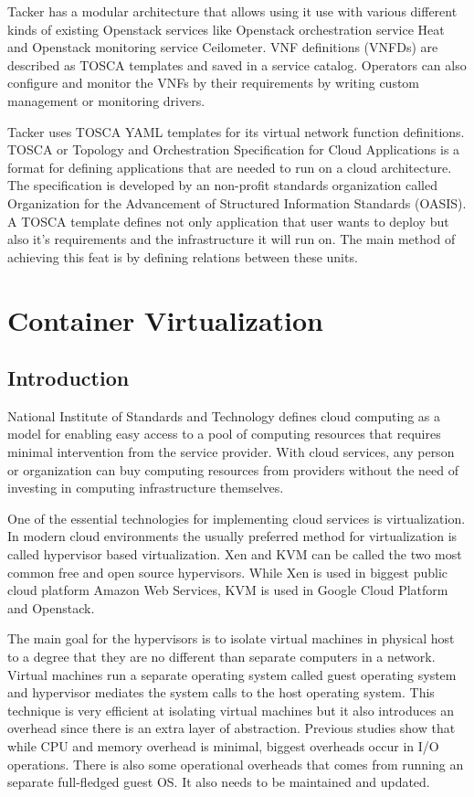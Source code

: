 \documentclass[12pt,oneandhalf,chaparabic,ceng,ms,eng,oneside,pntc]{gsufbe}
\begin{document}
Tacker has a modular architecture that allows using it use with various different kinds of
existing Openstack services like Openstack orchestration service Heat and Openstack monitoring service
Ceilometer. VNF definitions (VNFDs) are described as TOSCA templates and saved in a service catalog.
Operators can also configure and monitor the VNFs by their requirements by writing custom management or
monitoring drivers.

Tacker uses TOSCA YAML templates for its virtual network function definitions. TOSCA or Topology and
Orchestration Specification for Cloud Applications is a format for defining applications that are needed
to run on a cloud architecture. The specification is developed by an non-profit standards organization
called Organization for the Advancement of Structured Information Standards (OASIS).
A TOSCA template defines not only application that user wants to deploy but also
it's requirements and the infrastructure it will run on. The main method of achieving
this feat is by defining relations between these units.


\chapter{Container Virtualization}
\section{Introduction}
National Institute of Standards and Technology defines cloud computing as a model for enabling
easy access to a pool of computing resources that requires minimal intervention from the service
provider. With cloud services, any person or organization can buy computing resources from providers
without the need of investing in computing infrastructure themselves. 

One of the essential technologies for implementing cloud services is virtualization. In modern cloud
environments the usually preferred method for virtualization is called hypervisor based virtualization.
Xen and KVM can be called the two most common free and open source hypervisors. While Xen is used in
biggest public cloud platform Amazon Web Services, KVM is used in Google Cloud Platform and Openstack.

The main goal for the hypervisors is to isolate virtual machines in physical host to a degree that they
are no different than separate computers in a network. Virtual machines run a separate operating system
called guest operating system and hypervisor mediates the system calls to the host operating system.
This technique is very efficient at isolating virtual machines but it also introduces an overhead
since there is an extra layer of abstraction. Previous studies show that while CPU and memory overhead
is minimal, biggest overheads occur in I/O operations. There is also some operational overheads that
comes from running an separate full-fledged guest OS. It also needs to be maintained and updated.
\end{document}
